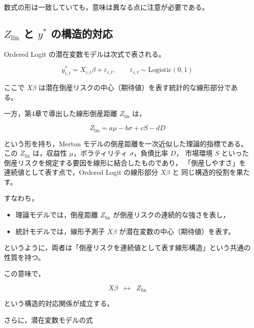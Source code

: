 数式の形は一致していても，意味は異なる点に注意が必要である。


\subsection{$Z_{\text{lin}}$ と $y^*$ の構造的対応}

Ordered Logit の潜在変数モデルは次式で表される。



\[
y^*_{i,t}
=
X_{i,t}\beta + \varepsilon_{i,t},
\qquad
\varepsilon_{i,t} \sim \text{Logistic}(0,1)
\]



ここで $X\beta$ は潜在倒産リスクの中心（期待値）を表す統計的な線形部分である。

一方，第4章で導出した線形倒産距離 $Z_{\text{lin}}$ は，



\[
Z_{\text{lin}} = a\mu - b\sigma + cS - dD
\]



という形を持ち，Merton モデルの倒産距離を一次近似した理論的指標である。
この $Z_{\text{lin}}$ は，収益性 $\mu$，ボラティリティ $\sigma$，負債比率 $D$，
市場環境 $S$ といった倒産リスクを規定する要因を線形に結合したものであり，
「倒産しやすさ」を連続値として表す点で，Ordered Logit の線形部分 $X\beta$ と
同じ構造的役割を果たす。

すなわち，

\begin{itemize}
    \item 理論モデルでは，倒産距離 $Z_{\text{lin}}$ が倒産リスクの連続的な強さを表し，
    \item 統計モデルでは，線形予測子 $X\beta$ が潜在変数の中心（期待値）を表す。
\end{itemize}

というように，両者は「倒産リスクを連続値として表す線形構造」という共通の性質を持つ。

この意味で，



\[
X\beta \;\;\longleftrightarrow\;\; Z_{\text{lin}}
\]



という構造的対応関係が成立する。

さらに，潜在変数モデルの式



